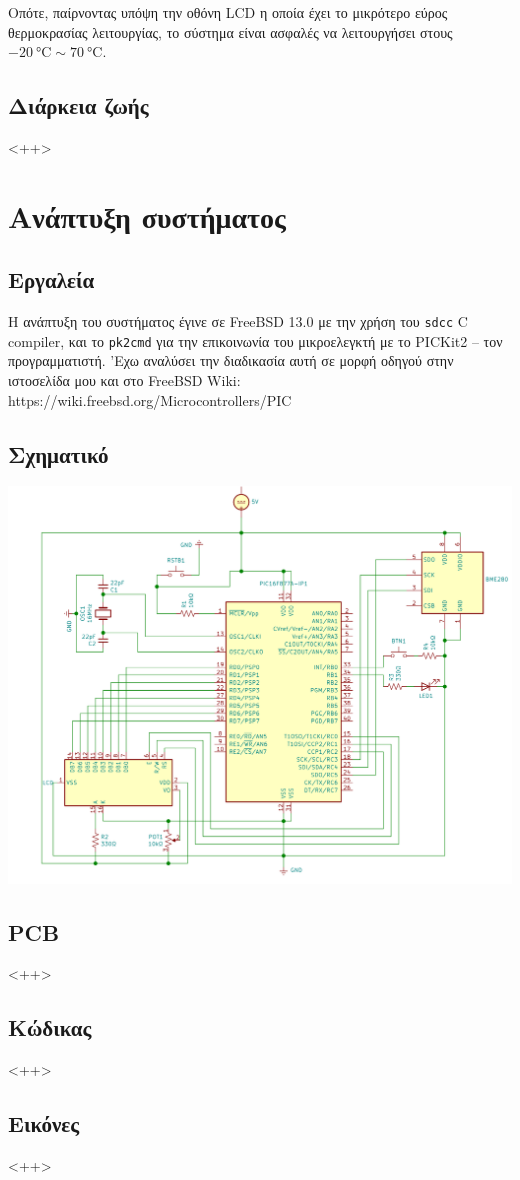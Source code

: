 \documentclass{article}
\begin{document}
Οπότε, παίρνοντας υπόψη την οθόνη LCD η οποία έχει το μικρότερο
εύρος θερμοκρασίας λειτουργίας, το σύστημα είναι ασφαλές να
λειτουργήσει στους $\SI{-20}{\celsius} \sim \SI{70}{\celsius}$.

\subsection{Διάρκεια ζωής}

<++>

\section{Ανάπτυξη συστήματος}
\subsection{Εργαλεία}
Η ανάπτυξη του συστήματος έγινε σε FreeBSD 13.0 με την χρήση του
\lstinline{sdcc} C compiler, και το \lstinline{pk2cmd} για την
επικοινωνία του μικροελεγκτή με το PICKit2 -- τον προγραμματιστή.
'Εχω αναλύσει την διαδικασία αυτή σε μορφή οδηγού στην ιστοσελίδα
μου και στο FreeBSD Wiki: https://wiki.freebsd.org/Microcontrollers/PIC

\subsection{Σχηματικό}
\begin{center}
	\includegraphics[width=\linewidth]{./res/schem.png}
\end{center}

\subsection{PCB}
<++>

\subsection{Κώδικας}
<++>

\subsection{Εικόνες}
<++>
\end{document}

